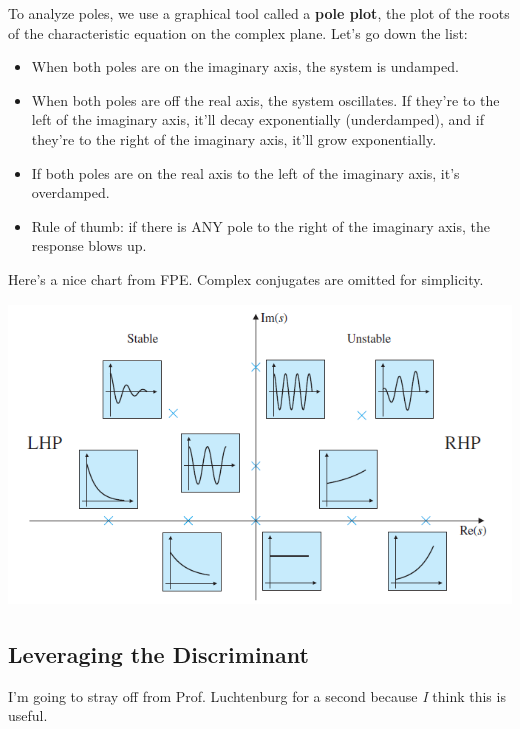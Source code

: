 \documentclass{article}
\begin{document}
\begin{onehalfspacing}
\begin{flushleft}
\medskip

To analyze poles, we use a graphical tool called a \textbf{pole plot}, the plot of the roots of the characteristic equation on the complex plane. Let's go down the list:

\begin{itemize}[noitemsep]
    \item When both poles are on the imaginary axis, the system is undamped.
    \item When both poles are off the real axis, the system oscillates. If they're to the left of the imaginary axis, it'll decay exponentially (underdamped), and if they're to the right of the imaginary axis, it'll grow exponentially.
    \item If both poles are on the real axis to the left of the imaginary axis, it's overdamped.
    \item Rule of thumb: if there is ANY pole to the right of the imaginary axis, the response blows up.
\end{itemize}

Here's a nice chart from FPE. Complex conjugates are omitted for simplicity.

\begin{center}
    {\includegraphics[height=8cm]{7_fpe}}
\end{center}

\subsection{Leveraging the Discriminant}

I'm going to stray off from Prof. Luchtenburg for a second because \textit{I} think this is useful.

\medskip


\end{flushleft}
\end{onehalfspacing}
\end{document}
